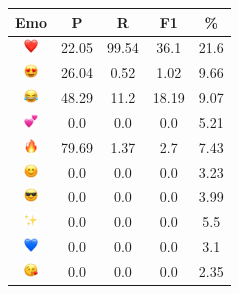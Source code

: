 \documentclass{article}
\begin{document}
\begin{table}
\centering
\begin{tabular}{|c|ccc|c|} \hline
\textbf{Emo} & \textbf{P} & \textbf{R} & \textbf{F1} & \textbf{\%} \\ \hline
\includegraphics[height=0.37cm,width=0.37cm]{img/red_heart.png} & 22.05 & 99.54 & 36.1 & 21.6\\ 
\includegraphics[height=0.37cm,width=0.37cm]{img/smiling_face_with_hearteyes.png} & 26.04 & 0.52 & 1.02 & 9.66\\ 
\includegraphics[height=0.37cm,width=0.37cm]{img/face_with_tears_of_joy.png} & 48.29 & 11.2 & 18.19 & 9.07\\ 
\includegraphics[height=0.37cm,width=0.37cm]{img/two_hearts.png} & 0.0 & 0.0 & 0.0 & 5.21\\ 
\includegraphics[height=0.37cm,width=0.37cm]{img/fire.png} & 79.69 & 1.37 & 2.7 & 7.43\\ 
\includegraphics[height=0.37cm,width=0.37cm]{img/smiling_face_with_smiling_eyes.png} & 0.0 & 0.0 & 0.0 & 3.23\\ 
\includegraphics[height=0.37cm,width=0.37cm]{img/smiling_face_with_sunglasses.png} & 0.0 & 0.0 & 0.0 & 3.99\\ 
\includegraphics[height=0.37cm,width=0.37cm]{img/sparkles.png} & 0.0 & 0.0 & 0.0 & 5.5\\ 
\includegraphics[height=0.37cm,width=0.37cm]{img/blue_heart.png} & 0.0 & 0.0 & 0.0 & 3.1\\ 
\includegraphics[height=0.37cm,width=0.37cm]{img/face_blowing_a_kiss.png} & 0.0 & 0.0 & 0.0 & 2.35\\ 

\end{tabular}
\end{table}
\end{document}

